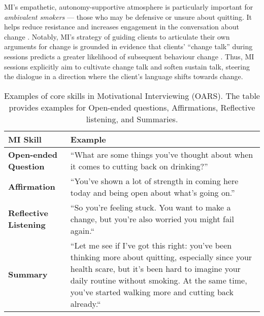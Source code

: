 MI's empathetic, autonomy-supportive atmosphere is particularly important for \emph{ambivalent smokers} --- those who may be defensive or unsure about quitting. It helps reduce resistance and increases engagement in the conversation about change \cite{Rollnick1997, MillerRollnick2023}. Notably, MI's strategy of guiding clients to articulate their own arguments for change is grounded in evidence that clients' ``change talk'' during sessions predicts a greater likelihood of subsequent behaviour change \cite{MillerRose2009}. Thus, MI sessions explicitly aim to cultivate change talk and soften sustain talk, steering the dialogue in a direction where the client's language shifts towards change.



\begin{table}[ht!]
\centering
\begin{tabular}{@{} p{} p{} @{}}
\toprule
\textbf{MI Skill} & \textbf{Example} \\
\midrule
\textbf{Open-ended Question} & 
``What are some things you've thought about when it comes to cutting back on drinking?'' \\
\addlinespace
\textbf{Affirmation} & 
``You've shown a lot of strength in coming here today and being open about what’s going on.'' \\
\addlinespace
\textbf{Reflective Listening} & 
``So you're feeling stuck. You want to make a change, but you're also worried you might fail again.`` \\
\addlinespace
\textbf{Summary} & 
``Let me see if I've got this right: you've been thinking more about quitting, especially since your health scare, but it's been hard to imagine your daily routine without smoking. At the same time, you’ve started walking more and cutting back already.`` \\
\bottomrule
\end{tabular}
\caption[Examples of MI Skills]{Examples of core skills in Motivational Interviewing (OARS). The table provides examples for Open-ended questions, Affirmations, Reflective listening, and Summaries.}
\label{tab:mi_skill_examples}
\end{table}




